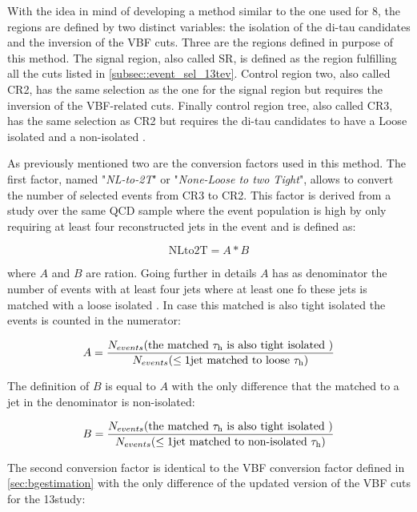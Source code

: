 With the idea in mind of developing a method similar to the one used for 8\tev, the regions are defined by two distinct variables: the isolation of the di-tau candidates and the inversion of the VBF cuts. Three are the regions defined in purpose of this method. The signal region, also called SR, is defined as the region fulfilling all the cuts listed in \autoref{subsec::event_sel_13tev}. Control region two, also called CR2, has the same selection as the one for the signal region but requires the inversion of the VBF-related cuts. Finally control region tree, also called CR3, has the same selection as CR2 but requires the di-tau candidates to have a Loose isolated and a non-isolated \hadtau.

As previously mentioned two are the conversion factors used in this method. The first factor, named "\textit{NL-to-2T}" or "\textit{None-Loose to two Tight}", allows to convert the number of selected events from CR3 to CR2. This factor is derived from a study over the same QCD sample where the event population is high by only requiring at least four reconstructed jets in the event and is defined as:

\begin{equation}
\text{NLto2T} = A * B
\end{equation}

where $A$ and $B$ are ration. Going further in details $A$ has as denominator the number of events with at least four jets where at least one fo these jets is matched with a loose isolated \hadtau. In case this matched \hadtau is also tight isolated the events is counted in the numerator:

\begin{equation}
A = \dfrac{N_{events}(\text{the matched }\tau_{\text{h}}\text{ is also tight isolated })}{N_{events}(\leq 1\text{jet matched to loose }\tau_{\text{h}})}
\end{equation}

The definition of $B$ is equal to $A$ with the only difference that the \hadtau matched to a jet in the denominator is non-isolated:

\begin{equation}
B = \dfrac{N_{events}(\text{the matched }\tau_{\text{h}}\text{ is also tight isolated })}{N_{events}(\leq 1\text{jet matched to non-isolated }\tau_{\text{h}})}
\end{equation}

The second conversion factor is identical to the VBF conversion factor defined in \autoref{sec:bgestimation} with the only difference of the updated version of the VBF cuts for the 13\tev study:

